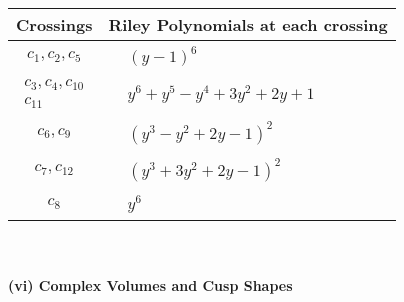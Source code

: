 \documentclass[1p]{elsarticle_modified}
\theoremstyle{definition}
\begin{document}
\begin{tabular}{m{50pt}|m{274pt}}
Crossings & \hspace{64pt}Riley Polynomials at each crossing \\
\hline $$\begin{aligned}c_{1},c_{2},c_{5}\end{aligned}$$&$\begin{aligned}
&(y-1)^6
\end{aligned}$\\
\hline $$\begin{aligned}c_{3},c_{4},c_{10}\\c_{11}\end{aligned}$$&$\begin{aligned}
&y^6+y^5- y^4+3 y^2+2 y+1
\end{aligned}$\\
\hline $$\begin{aligned}c_{6},c_{9}\end{aligned}$$&$\begin{aligned}
&(y^3- y^2+2 y-1)^2
\end{aligned}$\\
\hline $$\begin{aligned}c_{7},c_{12}\end{aligned}$$&$\begin{aligned}
&(y^3+3 y^2+2 y-1)^2
\end{aligned}$\\
\hline $$\begin{aligned}c_{8}\end{aligned}$$&$\begin{aligned}
&y^6
\end{aligned}$\\
\hline
\end{tabular}\\~\\
\newpage\flushleft \textbf{(vi) Complex Volumes and Cusp Shapes}
\end{document}
